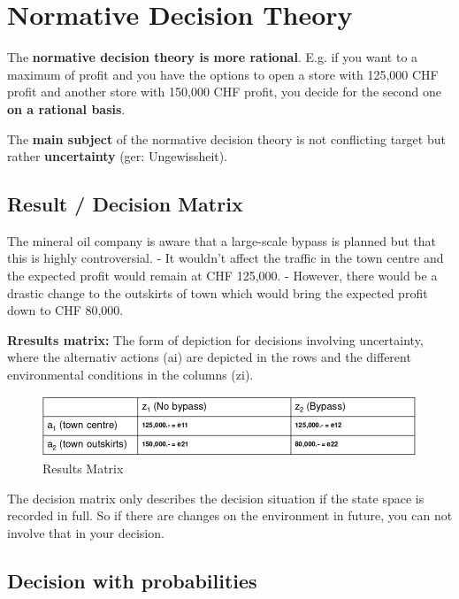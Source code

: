 \hypertarget{normative-decision-theory}{%
\section{Normative Decision Theory}\label{normative-decision-theory}}

The \textbf{normative decision theory is more rational}. E.g. if you
want to a maximum of profit and you have the options to open a store
with 125,000 CHF profit and another store with 150,000 CHF profit, you
decide for the second one \textbf{on a rational basis}.

The \textbf{main subject} of the normative decision theory is not
conflicting target but rather \textbf{uncertainty} (ger: Ungewissheit).

\hypertarget{result-decision-matrix}{%
\subsection{Result / Decision Matrix}\label{result-decision-matrix}}

The mineral oil company is aware that a large-scale bypass is planned
but that this is highly controversial. - It wouldn't affect the traffic
in the town centre and the expected profit would remain at CHF 125,000.
- However, there would be a drastic change to the outskirts of town
which would bring the expected profit down to CHF 80,000.

\textbf{Rresults matrix:} The form of depiction for decisions involving
uncertainty, where the alternativ actions (ai) are depicted in the rows
and the different environmental conditions in the columns (zi).

\begin{figure}
\centering
\includegraphics{figures/resultMatrix.png}
\caption{Results Matrix}
\end{figure}

The decision matrix only describes the decision situation if the state
space is recorded in full. So if there are changes on the environment in
future, you can not involve that in your decision.

\hypertarget{decision-with-probabilities}{%
\subsection{Decision with
probabilities}\label{decision-with-probabilities}}

